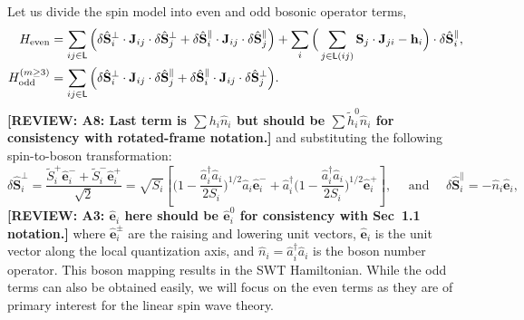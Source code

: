 \documentclass[aps, prx, nofootinbib, superscriptaddress]{revtex4-2}
\newcommand{\REVIEW}[1]{{\color{reviewcolor}\bfseries [REVIEW: #1]}}
\begin{document}
Let us divide the spin model into even and odd bosonic operator terms,
\begin{subequations}\label{eq: LSWT boson expansion even/odd}
    \begin{align}
        H_{\rm even} &= \sum_{ij\in\mathsf{L}} 
        \Big( \delta \hat{\mathbf{S}}_{i}^{\perp} \cdot \mathbf{J}_{ij} \cdot \delta \hat{\mathbf{S}}_{j}^{\perp} 
        + \delta \hat{\mathbf{S}}_{i}^{\parallel} \cdot \mathbf{J}_{ij} \cdot \delta \hat{\mathbf{S}}_{j}^{\parallel} \Big)
        + \sum_{i} \Big( \sum_{j \in \mathsf{L}(ij)} \mathbf{S}_{j} \cdot \mathbf{J}_{ji} - \mathbf{h}_{i} \Big) \cdot \delta \hat{\mathbf{S}}_{i}^{\parallel},
        \label{subeq: even bosonic terms in SWT} \\
        H_{\rm odd}^{(m \ge 3)} &= \sum_{ij\in\mathsf{L}} 
        \Big( \delta \hat{\mathbf{S}}_{i}^{\perp} \cdot \mathbf{J}_{ij} \cdot \delta \hat{\mathbf{S}}_{j}^{\parallel} 
        + \delta \hat{\mathbf{S}}_{i}^{\parallel} \cdot \mathbf{J}_{ij} \cdot \delta \hat{\mathbf{S}}_{j}^{\perp} \Big).
        \label{subeq: odd bosonic terms in SWT} 
    \end{align}
\end{subequations}
\REVIEW{A8: Last term is $\sum h_i \hat{n}_i$ but should be $\sum \widetilde{h}_i^0 \hat{n}_i$ for consistency with rotated-frame notation.}
and substituting the following spin-to-boson transformation:
\begin{equation}
    \delta \hat{\mathbf{S}}_{i}^{\perp} = \frac{\widetilde{S}_{i}^{+} \hat{\mathbf{e}}^{-}_{i} + \widetilde{S}_{i}^{-} \hat{\mathbf{e}}^{+}_{i} }{\sqrt{2}} = \sqrt{S_{i}} \left[ \Big( 1 - \frac{\hat{a}^{\dagger}_{i}\hat{a}_{i}}{2S_{i}} \Big)^{1/2} \hat{a}_{i} \hat{\mathbf{e}}_{i}^{-} + \hat{a}_{i}^{\dagger} \Big( 1 - \frac{\hat{a}^{\dagger}_{i}\hat{a}_{i}}{2S_{i}} \Big)^{1/2} \hat{\mathbf{e}}_{i}^{+} \right], 
    \quad \text{ and } \quad
    \delta \hat{\mathbf{S}}^{\parallel}_{i} =  - \hat{n}_{i} \hat{\mathbf{e}}_{i},
\end{equation}
\REVIEW{A3: $\hat{\mathbf{e}}_{i}$ here should be $\hat{\mathbf{e}}_{i}^{0}$ for consistency with Sec~1.1 notation.}
where $\hat{\mathbf{e}}_{i}^{\pm}$ are the raising and lowering unit vectors, $\hat{\mathbf{e}}_{i}$ is the unit vector along the local quantization axis, and $\hat{n}_{i} = \hat{a}^{\dagger}_{i}\hat{a}_{i}$ is the boson number operator.
This boson mapping results in the SWT Hamiltonian. 
While the odd terms can also be obtained easily, we will focus on the even terms as they are of primary interest for the linear spin wave theory.
\end{document}
